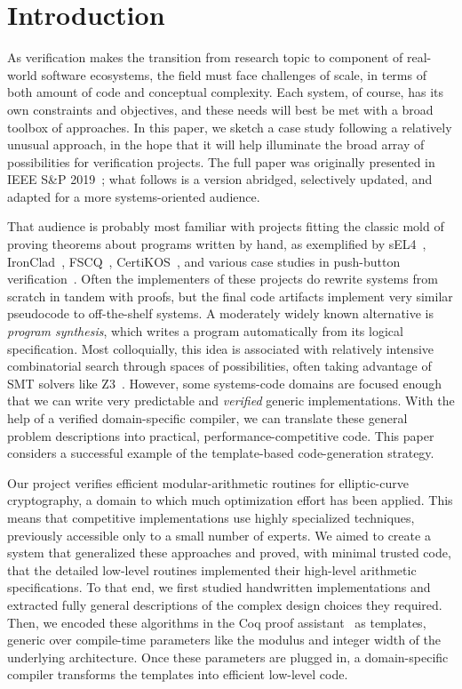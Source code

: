 \documentclass[letterpaper,twocolumn,10pt]{article}
\begin{document}
\section{Introduction}

As verification makes the transition from research topic to component of real-world software ecosystems, the field must face challenges of scale, in terms of both amount of code and conceptual complexity.
Each system, of course, has its own constraints and objectives, and these needs will best be met with a broad toolbox of approaches.
In this paper, we sketch a case study following a relatively unusual approach, in the hope that it will help illuminate the broad array of possibilities for verification projects.
The full paper was originally presented in IEEE S\&P 2019~\cite{FiatCryptoSP19}; what follows is a version abridged, selectively updated, and adapted for a more systems-oriented audience.

That audience is probably most familiar with projects fitting the classic mold of proving theorems about programs written by hand, as exemplified by sEL4~\cite{seL4SOSP09}, IronClad~\cite{hawblitzel2014ironclad,hawblitzel2015ironfleet}, FSCQ~\cite{FscqSOSP15,FscqSOSP17,FscqOSDI18}, CertiKOS~\cite{CertiKOS}, and various case studies in push-button verification~\cite{Pbfs,Hyperkernel,Nickel,Serval}.
Often the implementers of these projects do rewrite systems from scratch in tandem with proofs, but the final code artifacts implement very similar pseudocode to off-the-shelf systems.
A moderately widely known alternative is \emph{program synthesis}, which writes a program automatically from its logical specification.
Most colloquially, this idea is associated with relatively intensive combinatorial search through spaces of possibilities, often taking advantage of SMT solvers like Z3~\cite{Z3}.
However, some systems-code domains are focused enough that we can write very predictable and \emph{verified} generic implementations.
With the help of a verified domain-specific compiler, we can translate these general problem descriptions into practical, performance-competitive code.
This paper considers a successful example of the template-based code-generation strategy.

Our project verifies efficient modular-arithmetic routines for elliptic-curve cryptography, a domain to which much optimization effort has been applied.
This means that competitive implementations use highly specialized techniques, previously accessible only to a small number of experts.
We aimed to create a system that generalized these approaches and proved, with minimal trusted code, that the detailed low-level routines implemented their high-level arithmetic specifications.
To that end, we first studied handwritten implementations and extracted fully general descriptions of the complex design choices they required.
Then, we encoded these algorithms in the Coq proof assistant~\cite{coq} as templates, generic over compile-time parameters like the modulus and integer width of the underlying architecture.
Once these parameters are plugged in, a domain-specific compiler transforms the templates into efficient low-level code.
\end{document}
